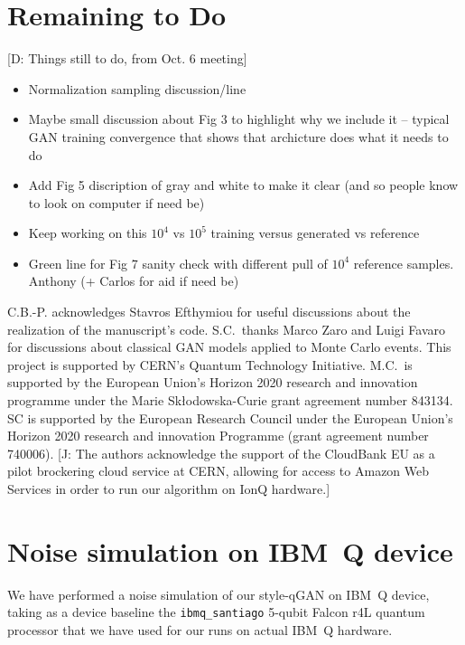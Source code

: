 \documentclass[twocolumn,preprintnumbers,superscriptaddress]{revtex4-2}
\newcommand{\commentJB}[1]{{\color{blue} {[J: #1]}}}
\newcommand{\commentDMG}[1]{{\color{orange} {[D: #1]}}}
\begin{document}
\section{Remaining to Do}
\commentDMG{Things still to do, from Oct. 6 meeting}
\begin{itemize}
\item Normalization sampling discussion/line
\item Maybe small discussion about Fig 3 to highlight why we include it -- typical GAN training convergence that shows that archicture does what it needs to do
\item Add Fig 5 discription of gray and white to make it clear (and so people know to look on computer if need be)
\item Keep working on this $10^4$ vs $10^5$ training versus generated vs reference
\item Green line for Fig 7 sanity check with different pull of $10^4$ reference samples. Anthony (+ Carlos for aid if need be)
\end{itemize}
\fi

\acknowledgments

C.B.-P. acknowledges Stavros Efthymiou for useful discussions about the
realization of the manuscript's code. S.C.~thanks Marco Zaro and Luigi Favaro for
discussions about classical GAN models applied to Monte Carlo events. This
project is supported by CERN's Quantum Technology Initiative. 
M.C.\ is supported by the European Union’s Horizon 2020 research and innovation programme under the Marie Skłodowska-Curie grant agreement number 843134.
SC is supported by the European Research
Council under the European Union's Horizon 2020 research and innovation
Programme (grant agreement number 740006). \commentJB{The authors acknowledge the support of the CloudBank EU as a pilot brockering cloud service at CERN, allowing
 for access to Amazon Web Services in order to run our algorithm on IonQ hardware.}


\appendix

\section{Noise simulation on IBM~Q device}
\label{sec:appendixnoise}

We have performed a noise simulation of our style-qGAN on IBM~Q device, taking as a device baseline the {\tt ibmq\_santiago}
5-qubit Falcon r4L quantum processor that we have used for our runs on actual IBM~Q hardware.
\end{document}
